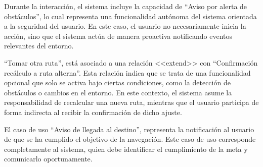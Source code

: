 Durante la interacción, el sistema incluye la capacidad de “Aviso por alerta de obstáculos”, lo cual representa una funcionalidad autónoma del sistema orientada a la seguridad del usuario. En este caso, el usuario no necesariamente inicia la acción, sino que el sistema actúa de manera proactiva notificando eventos relevantes del entorno.

“Tomar otra ruta”, está asociado a una relación <<extend>> con “Confirmación recálculo a ruta alterna”. Esta relación indica que se trata de una funcionalidad opcional que solo se activa bajo ciertas condiciones, como la detección de obstáculos o cambios en el entorno. En este contexto, el sistema asume la responsabilidad de recalcular una nueva ruta, mientras que el usuario participa de forma indirecta al recibir la confirmación de dicho ajuste.

El caso de uso “Aviso de llegada al destino”, representa la notificación al usuario de que se ha cumplido el objetivo de la navegación. Este caso de uso corresponde completamente al sistema, quien debe identificar el cumplimiento de la meta y comunicarlo oportunamente.